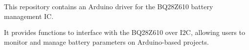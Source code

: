 This repository contains an Arduino driver for the BQ28\+Z610 battery management IC.

It provides functions to interface with the BQ28\+Z610 over I2C, allowing users to monitor and manage battery parameters on Arduino-\/based projects. 